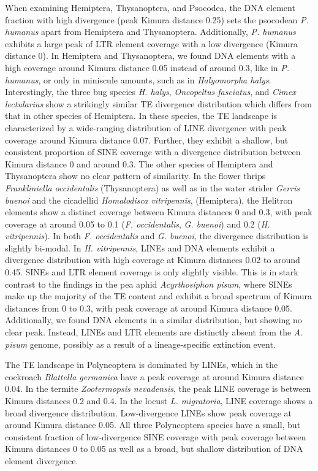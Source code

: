 When examining Hemiptera, Thysanoptera, and Psocodea, the DNA element
fraction with high divergence (peak Kimura distance 0.25) sets the
psocodean \emph{P. humanus} apart from Hemiptera and Thysanoptera.
Additionally, \emph{P. humanus} exhibits a large peak of LTR element
coverage with a low divergence (Kimura distance 0). In Hemiptera and
Thysanoptera, we found DNA elements with a high coverage around Kimura
distance 0.05 instead of around 0.3, like in \emph{P. humanus}, or only
in miniscule amounts, such as in \emph{Halyomorpha halys}.
Interestingly, the three bug species \emph{H. halys}, \emph{Oncopeltus
fasciatus}, and \emph{Cimex lectularius} show a strikingly similar TE
divergence distribution which differs from that in other species of
Hemiptera. In these species, the TE landscape is characterized by a
wide-ranging distribution of LINE divergence with peak coverage around
Kimura distance 0.07. Further, they exhibit a shallow, but consistent
proportion of SINE coverage with a divergence distribution between
Kimura distance 0 and around 0.3. The other species of Hemiptera and
Thysanoptera show no clear pattern of similarity. In the flower thrips
\emph{Frankliniella occidentalis} (Thysanoptera) as well as in the water
strider \emph{Gerris buenoi} and the cicadellid \emph{Homalodisca
vitripennis}, (Hemiptera), the Helitron elements show a distinct
coverage between Kimura distances 0 and 0.3, with peak coverage at
around 0.05 to 0.1 (\emph{F. occidentalis}, \emph{G. buenoi}) and 0.2
(\emph{H. vitripennis}). In both \emph{F. occidentalis} and \emph{G.
buenoi}, the divergence distribution is slightly bi-modal. In \emph{H.
vitripennis}, LINEs and DNA elements exhibit a divergence distribution
with high coverage at Kimura distances 0.02 to around 0.45. SINEs and
LTR element coverage is only slightly visible. This is in stark contrast
to the findings in the pea aphid \emph{Acyrthosiphon pisum}, where SINEs
make up the majority of the TE content and exhibit a broad spectrum of
Kimura distances from 0 to 0.3, with peak coverage at around Kimura
distance 0.05. Additionally, we found DNA elements in a similar
distribution, but showing no clear peak. Instead, LINEs and LTR elements
are distinctly absent from the \emph{A. pisum} genome, possibly as a
result of a lineage-specific extinction event.

The TE landscape in Polyneoptera is dominated by LINEs, which in the
cockroach \emph{Blattella germanica} have a peak coverage at around
Kimura distance 0.04. In the termite \emph{Zootermopsis nevadensis}, the
peak LINE coverage is between Kimura distances 0.2 and 0.4. In the
locust \emph{L. migratoria}, LINE coverage shows a broad divergence
distribution. Low-divergence LINEs show peak coverage at around Kimura
distance 0.05. All three Polyneoptera species have a small, but
consistent fraction of low-divergence SINE coverage with peak coverage
between Kimura distances 0 to 0.05 as well as a broad, but shallow
distribution of DNA element divergence.



